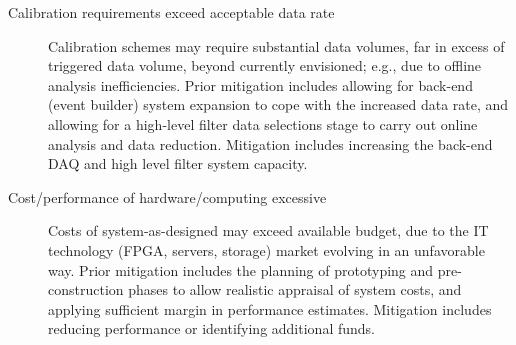 \begin{description}
\item[Calibration requirements exceed acceptable data rate]
  Calibration schemes may require substantial data 
volumes, far in excess of triggered data volume, beyond currently
envisioned; e.g., due to offline analysis inefficiencies. Prior
mitigation includes allowing for back-end (event builder) system expansion to cope
with the increased data rate, and allowing for a high-level filter data
selections stage to carry out online analysis and data
reduction. Mitigation includes increasing the back-end DAQ and high
level filter system capacity. 

\item[Cost/performance of hardware/computing excessive] Costs of
  system-as-designed may exceed available budget, due to the IT technology (FPGA, servers, storage) market evolving in an unfavorable way. Prior mitigation
  includes the planning of prototyping and pre-construction phases to allow
  realistic appraisal of system costs, and applying sufficient margin
  in performance estimates.  Mitigation includes reducing performance
  or identifying additional funds. 





\end{description}
